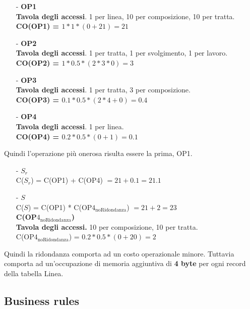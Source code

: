 \documentclass{article}
\begin{document}
\begin{itemize}
    \itemsep0em
    \item[-] \textbf{OP1} \\ \textbf{Tavola degli accessi}. 1 per linea, 10 per composizione, 10 per tratta. \vspace*{7pt}\\ \textbf{CO(OP1) = $1 * 1 * (0 + 21) = 21$}
    \item[-] \textbf{OP2} \\ \textbf{Tavola degli accessi}. 1 per tratta, 1 per svolgimento, 1 per lavoro. \vspace*{7pt}\\ \textbf{CO(OP2) = $1 * 0.5 * (2 * 3 * 0) = 3$}
    \item[-] \textbf{OP3} \\ \textbf{Tavola degli accessi}. 1 per tratta, 3 per composizione. \vspace*{7pt}\\ \textbf{CO(OP3) = $0.1 * 0.5 * (2 * 4 + 0) = 0.4$}
    \item[-] \textbf{OP4} \\ \textbf{Tavola degli accessi}. 1 per linea. \vspace*{7pt}\\ \textbf{CO(OP4) = $0.2 * 0.5 * (0 + 1) = 0.1$}
\end{itemize}
Quindi l'operazione più onerosa risulta essere la prima, OP1.
\begin{itemize}
    \itemsep0em
    \item[-] \textbf{$S_r$} \\ C($S_r$) = C(OP1) + C(OP4) $= 21 + 0.1 = 21.1$
    \item[-] \textbf{$S$} \\ C($S$) = C(OP1) * C(OP$4_{\text{noRidondanza}}$) $= 21 + 2 = 23$ \vspace*{7pt}\\ \textbf{C(OP$4_{\text{noRidondanza}}$)} \\ \textbf{Tavola degli accessi.} 10 per composizione, 10 per tratta. \vspace*{7pt}\\  C(OP$4_{\text{noRidondanza}}$) = $0.2 * 0.5 * (0 + 20) = 2$
\end{itemize}
Quindi la ridondanza comporta ad un costo operazionale minore. Tuttavia comporta ad un'occupazione di memoria aggiuntiva di \textbf{4 byte} per ogni record della tabella Linea.

\subsection*{Business rules}
\large
\end{document}
